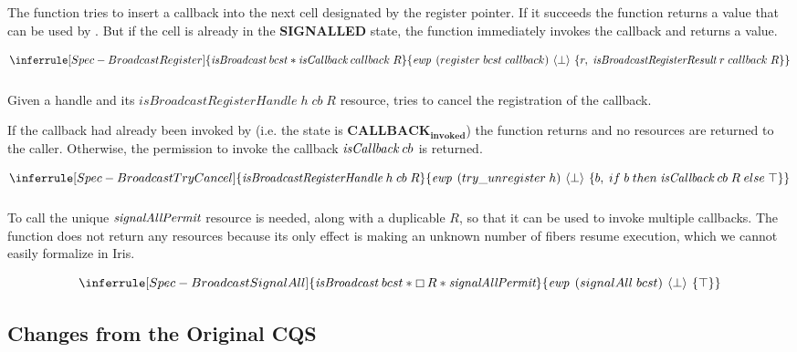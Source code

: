 The  function tries to insert a callback into the next cell designated by the register pointer.
If it succeeds the function returns a  value that can be used by .
But if the cell is already in the \textbf{SIGNALLED} state, the function immediately invokes the callback and returns a  value.

\[
  \inferrule[Spec-BroadcastRegister]
  { \gsIsBcst{}\; bcst \ast \gsIsCb{}\; callback\; R }
  { \ewp{register\; bcst\; callback}{\bot}{r,\; \emph{isBroadcastRegisterResult}\; r\; callback\; R}}
\]

\subsubsection{}
\label{sec:broadcast-spec-cance}

Given a handle and its \(\textit{isBroadcastRegisterHandle}\; h\; cb\; R\) resource,  tries to cancel the registration of the callback.

If the callback had already been invoked by  (i.e. the state is \(\textbf{CALLBACK}_\textbf{invoked}\)) the function returns  and no resources are returned to the caller.
Otherwise, the permission to invoke the callback \(\emph{isCallback}{}\; cb\) is returned.

\[
  \inferrule[Spec-BroadcastTryCancel]
  { \emph{isBroadcastRegisterHandle}\; h\; cb\; R }
  { \ewp{try\_unregister\; h}{\bot}{b,\; if\; b\; then\; \gsIsCb{}\; cb\; R\; else\; \top}}
\]

\subsubsection{}
\label{sec:broadcast-spec-signal-all}

To call  the unique \(\emph{signalAllPermit}{}\) resource is needed, along with a duplicable \(R\), so that it can be used to invoke multiple callbacks.
The function does not return any resources because its only effect is making an unknown number of fibers resume execution, which we cannot easily formalize in Iris.

\[
  \inferrule[Spec-BroadcastSignalAll]
  { \gsIsBcst{}\; bcst \ast \always R \ast \gssignal{}}
  { \ewp{signalAll\; bcst}{\bot}{\top} }
\]

\subsection{Changes from the Original CQS}
\label{sec:broadcast-spec-removed-features}

